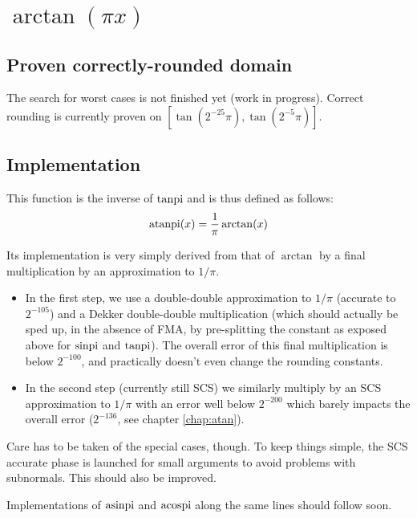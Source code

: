 \section{ $\arctan(\pi x)$}

\subsection{Proven correctly-rounded domain}

The search for worst cases is not finished yet (work in progress).
Correct rounding is currently proven on $[\tan(2^{-25}\pi),
\tan(2^{-5}\pi)]$.

\subsection{Implementation}
This function is the inverse of $\operatorname{tanpi}$ and is thus defined as follows:
$$\operatorname{atanpi}(x) = \frac{1}{\pi}\arctan(x)$$

Its implementation is very simply derived from that of $\arctan$ by a
final multiplication by an approximation to $1/\pi$.

\begin{itemize}
\item In the first step, we use a double-double approximation to
  $1/\pi$ (accurate to $2^{-105}$) and a Dekker double-double
  multiplication (which should actually be sped up, in the absence of
  FMA, by pre-splitting the constant as exposed above for $\operatorname{sinpi}$ and
  $\operatorname{tanpi}$).  The overall error of this final multiplication is below
  $2^{-100}$, and practically doesn't even change the rounding
  constants.

\item In the second step (currently still SCS) we similarly multiply
  by an SCS approximation to $1/\pi$ with an  error well below $2^{-200}$
  which barely impacts the  overall error ($2^{-136}$,
  see chapter \ref{chap:atan}).
\end{itemize}

Care has to be taken of the special cases, though. To keep things
simple, the SCS accurate phase is launched for small arguments to
avoid problems with subnormals. This should also be improved.



Implementations of $\operatorname{asinpi}$ and $\operatorname{acospi}$ along the same lines should
follow soon.
